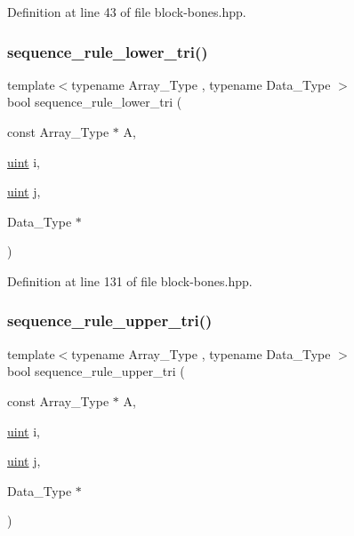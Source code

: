 Definition at line 43 of file block-\/bones.\+hpp.

\mbox{\label{block-bones_8hpp_a1e0c9474a332f7f0feacb6c83db47e09}} 
\subsubsection{\texorpdfstring{sequence\+\_\+rule\+\_\+lower\+\_\+tri()}{sequence\_rule\_lower\_tri()}}
{\footnotesize\ttfamily template$<$typename Array\+\_\+\+Type , typename Data\+\_\+\+Type $>$ \\
bool sequence\+\_\+rule\+\_\+lower\+\_\+tri (\begin{DoxyParamCaption}\item[{const Array\+\_\+\+Type $\ast$}]{A,  }\item[{\hyperlink{typedefs_8hpp_a91ad9478d81a7aaf2593e8d9c3d06a14}{uint}}]{i,  }\item[{\hyperlink{typedefs_8hpp_a91ad9478d81a7aaf2593e8d9c3d06a14}{uint}}]{j,  }\item[{Data\+\_\+\+Type $\ast$}]{ }\end{DoxyParamCaption})\hspace{0.3cm}{\ttfamily [inline]}}



Definition at line 131 of file block-\/bones.\+hpp.

\mbox{\label{block-bones_8hpp_af5065fcabecdb2c3eedc5f95389aadfc}} 
\subsubsection{\texorpdfstring{sequence\+\_\+rule\+\_\+upper\+\_\+tri()}{sequence\_rule\_upper\_tri()}}
{\footnotesize\ttfamily template$<$typename Array\+\_\+\+Type , typename Data\+\_\+\+Type $>$ \\
bool sequence\+\_\+rule\+\_\+upper\+\_\+tri (\begin{DoxyParamCaption}\item[{const Array\+\_\+\+Type $\ast$}]{A,  }\item[{\hyperlink{typedefs_8hpp_a91ad9478d81a7aaf2593e8d9c3d06a14}{uint}}]{i,  }\item[{\hyperlink{typedefs_8hpp_a91ad9478d81a7aaf2593e8d9c3d06a14}{uint}}]{j,  }\item[{Data\+\_\+\+Type $\ast$}]{ }\end{DoxyParamCaption})\hspace{0.3cm}{\ttfamily [inline]}}



